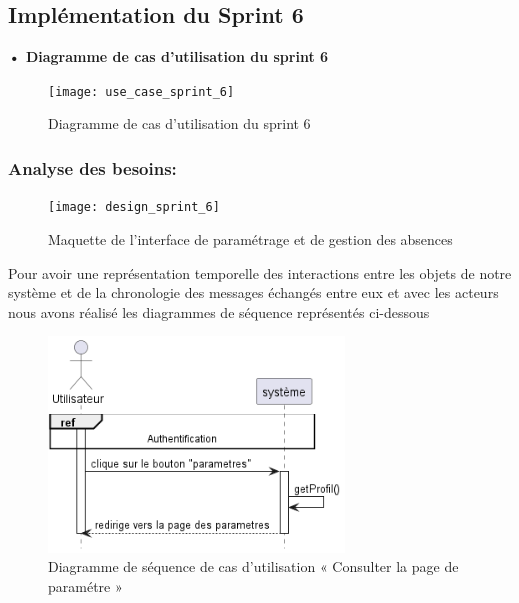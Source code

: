 \subsection{Implémentation du Sprint 6}
\textbf{•	Diagramme de cas d'utilisation du sprint 6}

\begin{figure}[H]
  \centering
  \texttt{[image: use\_case\_sprint\_6]}
  \caption{Diagramme de cas d'utilisation du sprint 6}
  \label{fig:UseCaseDiagramSp61}
\end{figure}

\subsubsection{Analyse des besoins:}

\begin{figure}[H]
  \centering
  \texttt{[image: design\_sprint\_6]}
  \caption{Maquette de l'interface de paramétrage et de gestion des absences}
  \label{fig:MaquetteInterfaceParametrageGestionAbsences}
\end{figure}


Pour avoir une représentation temporelle des interactions entre les objets de notre système et de la chronologie des messages échangés entre eux et avec les acteurs nous avons réalisé les diagrammes de séquence représentés ci-dessous

\begin{figure}[H]
  \centering
  \includegraphics[width=0.7\textwidth]{out/diagrams/sprint6/consult_settings_page/consult_settings_page}
  \caption{Diagramme de séquence de cas d'utilisation « Consulter la page de paramétre »}
  \label{fig:sequence_consult_settings_page}
\end{figure}

